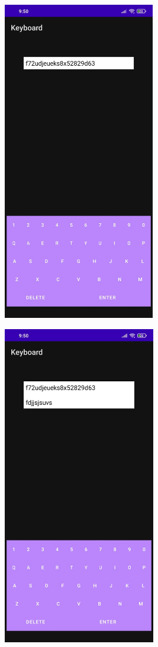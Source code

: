 \documentclass[12pt,letterpaper]{article}
\begin{document}
\begin{figure}
    \centering
    \includegraphics[height=14cm, keepaspectratio]{Keyboard/Outputs/OP1.jpeg}
\end{figure}
\begin{figure}
    \centering
    \includegraphics[height=14cm, keepaspectratio]{Keyboard/Outputs/OP2.jpeg}
\end{figure}
\end{document}
